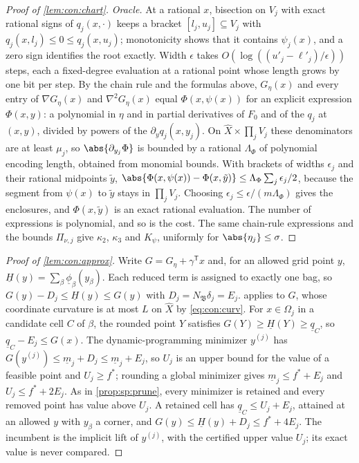 \begin{proof}[Proof of \cref{lem:con:chart}]
\emph{Oracle.} At a rational $x$, bisection on $V_j$ with exact rational
signs of $q_j(x,\cdot)$ keeps a bracket $[l_j,u_j]\subseteq V_j$ with
$q_j(x,l_j)\le0\le q_j(x,u_j)$; monotonicity shows that it contains
$\psi_j(x)$, and a zero sign identifies the root exactly. Width $\epsilon$
takes $O(\log((u'_j-\ell'_j)/\epsilon))$ steps, each a fixed-degree
evaluation at a rational point whose length grows by one bit per step. By
the chain rule and the formulas above, $G_\eta(x)$ and every entry of
$\nabla G_\eta(x)$ and $\nabla^2G_\eta(x)$ equal $\Phi(x,\psi(x))$ for an
explicit expression $\Phi(x,y)$: a polynomial in $\eta$ and in partial
derivatives of $F_0$ and of the $q_j$ at $(x,y)$, divided by powers of the
$\partial_yq_j(x,y_j)$. On $\widehat X\times\prod_jV_j$ these denominators
are at least $\mu_j$, so $\abs{\partial_{y_j}\Phi}$ is bounded by a rational
$\Lambda_\Phi$ of polynomial encoding length, obtained from monomial bounds.
With brackets of widths $\epsilon_j$ and their rational midpoints $\tilde y$,
$\abs{\Phi(x,\psi(x))-\Phi(x,\tilde y)}\le\Lambda_\Phi\sum_j\epsilon_j/2$,
because the segment from $\psi(x)$ to $\tilde y$ stays in $\prod_jV_j$.
Choosing $\epsilon_j\le\epsilon/(m\Lambda_\Phi)$ gives the enclosures, and
$\Phi(x,\tilde y)$ is an exact rational evaluation. The number of
expressions is polynomial, and so is the cost. The same chain-rule
expressions and the bounds $\Pi_{\nu,j}$ give $\kappa_2$, $\kappa_3$ and
$K_\psi$, uniformly for $\abs{\eta_j}\le\sigma$.
\end{proof}

\begin{proof}[Proof of \cref{lem:con:approx}]
Write $G=G_\eta+\gamma^{\mathsf T}x$ and, for an allowed grid point $y$,
$\underline H(y)=\sum_\beta\underline\phi_\beta(y_\beta)$. Each reduced term
is assigned to exactly one bag, so
$G(y)-D_j\le\underline H(y)\le G(y)$ with $D_j=N_{\mathfrak B}\delta_j=E_j$.
 applies to $G$, whose coordinate curvature is at most $L$
on $\widehat X$ by \eqref{eq:con:curv}. For $x\in\Omega_j$ in a candidate cell
$C$ of $\beta$, the rounded point $Y$ satisfies
$G(Y)\ge\underline H(Y)\ge\underline q_C$, so $\underline q_C-E_j\le G(x)$.
The dynamic-programming minimizer $y^{(j)}$ has
$G(y^{(j)})\le\underline m_j+D_j\le\underline m_j+E_j$, so $U_j$ is an upper
bound for the value of a feasible point and $U_j\ge f^*$; rounding a global
minimizer gives $\underline m_j\le f^*+E_j$ and $U_j\le f^*+2E_j$. As in
\cref{prop:sp:prune}, every minimizer is retained and every removed point has
value above $U_j$. A retained cell has $\underline q_C\le U_j+E_j$, attained at
an allowed $y$ with $y_\beta$ a corner, and
$G(y)\le\underline H(y)+D_j\le f^*+4E_j$. The incumbent is the implicit lift of
$y^{(j)}$, with the certified upper value $U_j$; its exact value is never
compared.
\end{proof}

